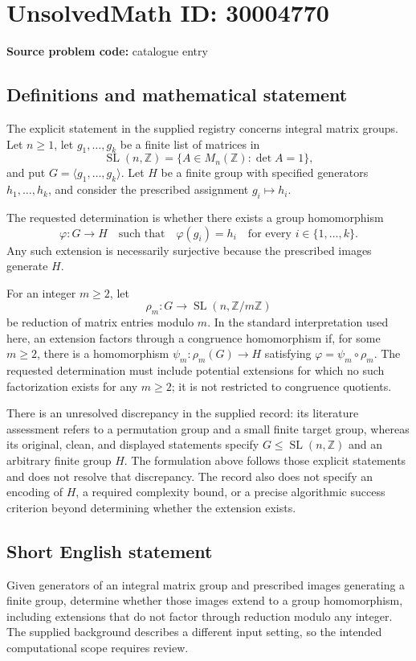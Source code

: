 \documentclass[11pt]{article}
\newcommand{\Z}{\mathbb{Z}}
\begin{document}
\section*{UnsolvedMath ID: 30004770}
\textbf{Source problem code:} catalogue entry
\subsection{Definitions and mathematical statement}
The explicit statement in the supplied registry concerns integral matrix groups. Let \(n\geq 1\), let \(g_1,\ldots,g_k\) be a finite list of matrices in
\[
\operatorname{SL}(n,\Z)=\{A\in M_n(\Z):\det A=1\},
\]
and put \(G=\langle g_1,\ldots,g_k\rangle\). Let \(H\) be a finite group with specified generators \(h_1,\ldots,h_k\), and consider the prescribed assignment \(g_i\mapsto h_i\).

The requested determination is whether there exists a group homomorphism
\[
\varphi:G\longrightarrow H
\quad\text{such that}\quad
\varphi(g_i)=h_i\quad\text{for every }i\in\{1,\ldots,k\}.
\]
Any such extension is necessarily surjective because the prescribed images generate \(H\).

For an integer \(m\geq 2\), let
\[
\rho_m:G\longrightarrow\operatorname{SL}(n,\Z/m\Z)
\]
be reduction of matrix entries modulo \(m\). In the standard interpretation used here, an extension factors through a congruence homomorphism if, for some \(m\geq2\), there is a homomorphism \(\psi_m:\rho_m(G)\to H\) satisfying \(\varphi=\psi_m\circ\rho_m\). The requested determination must include potential extensions for which no such factorization exists for any \(m\geq2\); it is not restricted to congruence quotients.

There is an unresolved discrepancy in the supplied record: its literature assessment refers to a permutation group and a small finite target group, whereas its original, clean, and displayed statements specify \(G\leq\operatorname{SL}(n,\Z)\) and an arbitrary finite group \(H\). The formulation above follows those explicit statements and does not resolve that discrepancy. The record also does not specify an encoding of \(H\), a required complexity bound, or a precise algorithmic success criterion beyond determining whether the extension exists.
\subsection{Short English statement}
Given generators of an integral matrix group and prescribed images generating a finite group, determine whether those images extend to a group homomorphism, including extensions that do not factor through reduction modulo any integer. The supplied background describes a different input setting, so the intended computational scope requires review.
\end{document}
